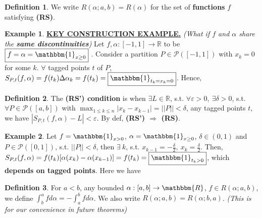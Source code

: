\documentclass[12pt,a4paper]{article}
\theoremstyle{definition}
\newtheorem{defin}{Definition}[subsection]
\newtheorem{ex}{Example}[subsection]
\newenvironment{definition}{
  \begin{defin}
}{
  \end{defin}
  \vspace{0.125em}
}
\newenvironment{example}{
  \begin{ex}
}{%
  \end{ex}
  \vspace{0.125em}
}
\begin{document}
\begin{definition}
  We write \underline{$R(\alpha; a, b) = R(\alpha)$} for the set of \textbf{functions} $f$ satisfying \textbf{(RS)}.
\end{definition}

\begin{example}
  \underline{\textbf{KEY CONSTRUCTION EXAMPLE.}} \textit{(What if $f$ and $\alpha$ share the \textbf{same discontinuities})} \newline
  \noindent Let $f, \alpha: [-1, 1] \to \mathbb{R}$ to be $\boxed{f = \alpha = \mathbbm{1}_{x \geq 0}}$ . Consider a partition $P \in \mathcal{P}([-1, 1])$ with \underline{$x_k = 0$} for some $k$. $\forall$ tagged points $t$ of $P$, \underline{$S_{P, t}(f, \alpha) = f(t_k) \Delta \alpha_k = f(t_k) = \boxed{\mathbbm{1}_{t_k = x_k = 0}}$}. Hence, 
\end{example}

\begin{definition}
  The \textbf{(RS') condition} is when $\exists L \in \mathbb{R}$, s.t. $\forall \varepsilon > 0,\ \exists \delta > 0$, s.t. $\forall P \in \mathcal{P}([a, b])$ with \underline{$\max_{1 \leq k \leq n} |x_k - x_{k - 1}| = ||P|| < \delta$}, any tagged points $t$, we have \underline{$|S_{P, t}(f, \alpha) - L| < \varepsilon$}. By def, \textbf{(RS') $\Rightarrow$ (RS)}.
\end{definition}

\begin{example}
  Let $f = \mathbbm{1}_{x > 0}$, $\alpha = \mathbbm{1}_{x \geq 0}$, $\delta \in (0, 1)$ and $P \in \mathcal{P}([0, 1])$, s.t. $||P|| < \delta$, then $\exists\ k$, s.t. \underline{$x_{k - 1} =  -\frac{\delta}{2},\ x_k = \frac{\delta}{2}$}. Then, $S_{P, t} (f, \alpha) = f(t_k)[\alpha(x_k) - \alpha(x_{k - 1})] = f(t_k) = \boxed{\mathbbm{1}_{t_k > 0}}$, which \textbf{depends on tagged points}. Here we have 
\end{example}

\begin{definition}
  For $a < b$, any bounded $\alpha: [a, b] \to \mathbbm{R}$, $f \in R(\alpha; a, b)$, we define \underline{$\int_b^a f d \alpha = -\int_a^b f d \alpha$}. We also write \underline{$R(\alpha; a, b) = R(\alpha; b, a)$}. \textit{(This is for our convenience in future theorems)}
\end{definition}

\setcounter{defin}{0}
\setcounter{ex}{0}
\end{document}
